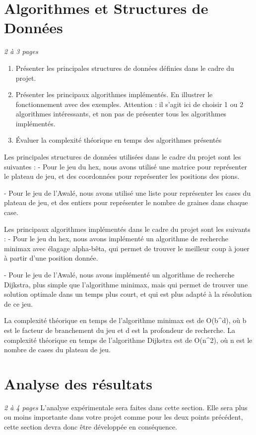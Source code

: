\documentclass[a4paper]{article} %
\begin{document}
\section{Algorithmes et Structures de Données}
\emph{2 à 3 pages}
\begin{enumerate}%
\item 	Présenter les principales structures de données définies dans le cadre du projet.
\item 	Présenter les principaux algorithmes implémentés. En illustrer le fonctionnement avec des exemples. Attention : il s'agit ici de choisir 1 ou 2 algorithmes intéressants, et non pas de présenter tous les algorithmes implémentés.
\item 	Évaluer la complexité théorique en temps des algorithmes présentés
\end{enumerate}

Les principales structures de données utilisées dans le cadre du projet sont les suivantes :
- Pour le jeu du hex, nous avons utilisé une matrice pour représenter le plateau de jeu,
et des coordonnées pour représenter les positions des pions.

- Pour le jeu de l'Awalé, nous avons utilisé une liste pour représenter les cases du plateau de jeu,
et des entiers pour représenter le nombre de graines dans chaque case.

Les principaux algorithmes implémentés dans le cadre du projet sont les suivants :
- Pour le jeu du hex, nous avons implémenté un algorithme de recherche minimax avec élagage alpha-bêta,
qui permet de trouver le meilleur coup à jouer à partir d'une position donnée.

- Pour le jeu de l'Awalé, nous avons implémenté un algorithme de recherche Dijkstra,
plus simple que l'algorithme minimax, 
mais qui permet de trouver une solution optimale dans un temps plus court,
et qui est plus adapté à la résolution de ce jeu.

La complexité théorique en temps de l'algorithme minimax est de O(b^d),
où b est le facteur de branchement du jeu et d est la profondeur de recherche.
La complexité théorique en temps de l'algorithme Dijkstra est de O(n^2),
où n est le nombre de cases du plateau de jeu.


\section{Analyse des résultats }
\emph{2 à 4 pages}
L'analyse expérimentale sera faites dans cette section.   Elle sera plus ou moins importante dans votre projet comme pour les deux points précédent, cette section devra donc être développée en conséquence.
\end{document}
